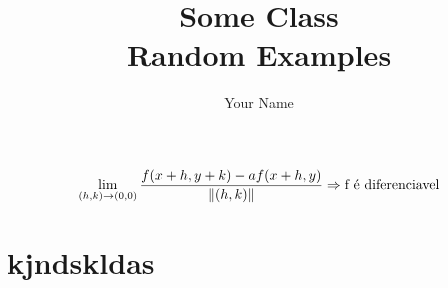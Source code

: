 \documentclass{report}
\title{\Huge{Some Class}\\Random Examples}
\author{\huge{Your Name}}
\date{}
\begin{document}
 \begin{equation}
   \lim_{(h, k) \to (0,0)} \frac{f(x + h, y + k) - af(x + h, y)}{\lVert(h, k)\rVert} \Rightarrow \text{f é diferenciavel}
 \end{equation}
 
 \chapter{kjndskldas}
\end{document}
